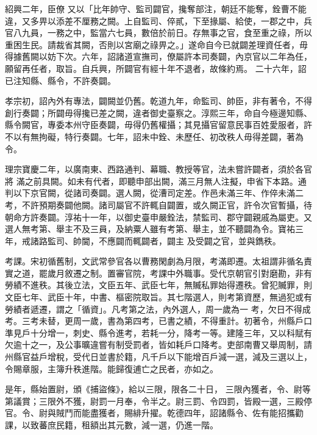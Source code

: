 \begin{pinyinscope}
 紹興二年，臣僚
 又以「比年帥守、監司闢官，攙奪部注，朝廷不能奪，銓曹不能違，又多畀以添差不厘務之闕。上自監司、倅貳，下至掾屬、給使，一郡之中，兵官八九員，一務之中，監當六七員，數倍於前日。存無事之官，食至重之祿，所以重困生民。請裁省其闕，否則以宮廟之祿畀之。」遂命自今已就闢差理資任者，毋得據舊闕以妨下次。六年，詔諸道宣撫司，僚屬許本司奏闢，內京官以二年為任，願留再任者，取旨。自兵興，所闢官有經十年不退者，故條約焉。
 二十六年，詔已注知縣、縣令，不許奏闢。



 孝宗初，詔內外有專法，闢闕並仍舊。乾道九年，命監司、帥臣，非有著令，不得創行奏闢；所闢毋得攙已差之闕，違者御史臺察之。淳熙三年，命自今極邊知縣、縣令闕官，專委本州守臣奏闢，毋得仍舊權攝；其見攝官留意民事百姓愛服者，許不以有無拘礙，特行奏闢。七年，詔未中銓、未歷任、初改秩人毋得差闢，著為令。



 理宗寶慶二年，以廣南東、西路通判、幕職、教授等官，法未嘗許闢者，須於各官將
 滿之前具闕。如未有代者，即聽申部出闕，滿三月無人注擬，申省下本路。通判以下京官闕，從諸司奏闢。選人闕，從漕司定差。作邑未滿三年、作倅未滿二考，不許預期奏闢他闕。諸司屬官不許輒自闢置，或久闕正官，許令次官暫攝，待朝命方許奏闢。淳祐十一年，以御史臺申嚴銓法，禁監司、郡守闢親戚為屬吏。又選人無考第、舉主不及三員，及納粟人雖有考第、舉主，並不聽闢為令。寶祐三年，戒諸路監司、帥閫，不應闢而輒闢者，闢主
 及受闢之官，並與鐫秩。



 考課。宋初循舊制，文武常參官各以曹務閑劇為月限，考滿即遷。太祖謂非循名責實之道，罷歲月敘遷之制。置審官院，考課中外職事。受代京朝官引對磨勘，非有勞績不進秩。其後立法，文臣五年、武臣七年，無贓私罪始得遷秩。曾犯贓罪，則文臣七年、武臣十年，中書、樞密院取旨。其七階選人，則考第資歷，無過犯或有勞績者遞遷，謂之「循資」。凡考第之法，內外選人，周一歲為一
 考，欠日不得成考。三考未替，更周一歲，書為第四考，已書之績，不得重計。初著令，州縣戶口準見戶十分增一，刺史、縣令進考，若耗一分，降考一等。建隆三年，又以科賦有欠逾十之一，及公事曠違嘗有制受罰者，皆如耗戶口降考。吏部南曹又舉周制，請州縣官益戶增稅，受代日並書於籍，凡千戶以下能增百戶減一選，減及三選以上，令賜章服，主簿升秩進階。能歸復逋亡之民者，亦如之。



 是年，縣始置尉，頒《捕盜條》，給以三限，限各二十日，
 三限內獲者，令、尉等第議賞；三限外不獲，尉罰一月奉，令半之。尉三罰、令四罰，皆殿一選，三殿停官。令、尉與賊鬥而能盡獲者，賜緋升擢。乾德四年，詔諸縣令、佐有能招攜勸課，以致蕃庶民籍，租額出其元數，減一選，仍進一階。




\end{pinyinscope}
